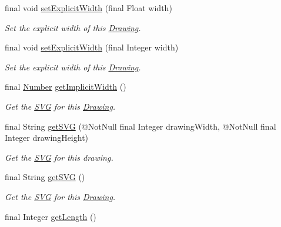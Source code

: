 \begin{DoxyCompactItemize}
final void \hyperlink{classcom_1_1aarrelaakso_1_1drawl_1_1_drawing_a94179f3b7c6b4619a2b86cc9f7716a77}{set\+Explicit\+Width} (final Float width)
\begin{DoxyCompactList}\small\item\em Set the explicit width of this \hyperlink{classcom_1_1aarrelaakso_1_1drawl_1_1_drawing}{Drawing}. \end{DoxyCompactList}\item 
final void \hyperlink{classcom_1_1aarrelaakso_1_1drawl_1_1_drawing_ac3b714abeb0f6132196b8a1e50b6de41}{set\+Explicit\+Width} (final Integer width)
\begin{DoxyCompactList}\small\item\em Set the explicit width of this \hyperlink{classcom_1_1aarrelaakso_1_1drawl_1_1_drawing}{Drawing}. \end{DoxyCompactList}\item 
final \hyperlink{interfacecom_1_1aarrelaakso_1_1drawl_1_1_number}{Number} \hyperlink{classcom_1_1aarrelaakso_1_1drawl_1_1_drawing_a67991c78d1f4989b0422b6cc36d339fe}{get\+Implicit\+Width} ()
\begin{DoxyCompactList}\small\item\em Get the \hyperlink{classcom_1_1aarrelaakso_1_1drawl_1_1_s_v_g}{S\+VG} for this \hyperlink{classcom_1_1aarrelaakso_1_1drawl_1_1_drawing}{Drawing}. \end{DoxyCompactList}\item 
final String \hyperlink{classcom_1_1aarrelaakso_1_1drawl_1_1_drawing_ac005562185c059c5cd14a1df92b335d6}{get\+S\+VG} (@Not\+Null final Integer drawing\+Width, @Not\+Null final Integer drawing\+Height)
\begin{DoxyCompactList}\small\item\em Get the \hyperlink{classcom_1_1aarrelaakso_1_1drawl_1_1_s_v_g}{S\+VG} for this drawing. \end{DoxyCompactList}\item 
final String \hyperlink{classcom_1_1aarrelaakso_1_1drawl_1_1_drawing_ada7c8b8df06ba84c1334e98751730500}{get\+S\+VG} ()
\begin{DoxyCompactList}\small\item\em Get the \hyperlink{classcom_1_1aarrelaakso_1_1drawl_1_1_s_v_g}{S\+VG} for this \hyperlink{classcom_1_1aarrelaakso_1_1drawl_1_1_drawing}{Drawing}. \end{DoxyCompactList}\item 
final Integer \hyperlink{classcom_1_1aarrelaakso_1_1drawl_1_1_drawing_a3977c6a791f29d87eaad10771ed8eb80}{get\+Length} ()

\end{DoxyCompactItemize}
